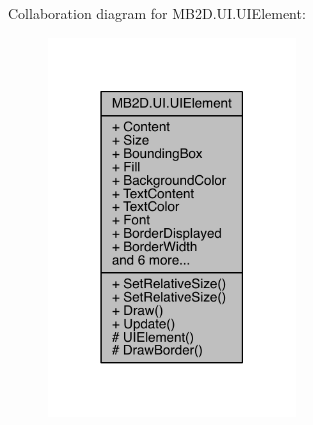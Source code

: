 Collaboration diagram for M\+B2\+D.\+U\+I.\+U\+I\+Element\+:
\nopagebreak
\begin{figure}[H]
\begin{center}
\leavevmode
\includegraphics[width=186pt]{class_m_b2_d_1_1_u_i_1_1_u_i_element__coll__graph}
\end{center}
\end{figure}
